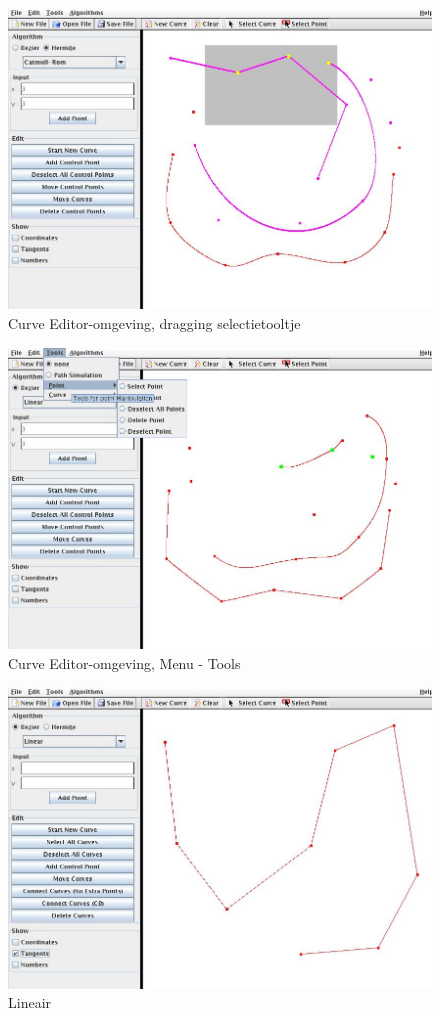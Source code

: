 \documentclass[a4paper,11pt,oneside, titlepage]{article}
\begin{document}
\begin{figure}[htbp]
\centering
\includegraphics[scale=0.4]{./screenies/selectPoint.jpg}
\caption{Curve Editor-omgeving, dragging selectietooltje}\label{scrSel}
\end{figure}
\begin{figure}[htbp]
\centering
\includegraphics[scale=0.4]{./screenies/menuTools.jpg}
\caption{Curve Editor-omgeving, Menu - Tools}\label{scrMenTo}
\end{figure}
\begin{figure}[htbp]
\centering
\includegraphics[scale=0.4]{./screenies/linear.jpg}
\caption{Lineair}\label{iL}
\end{figure}
\end{document}
